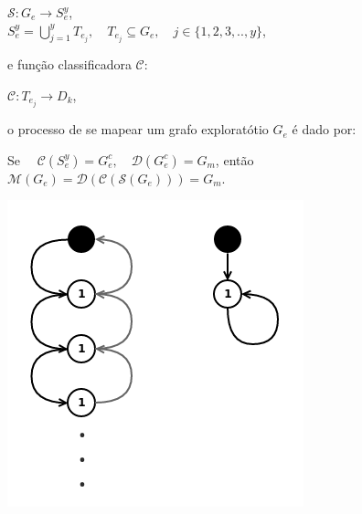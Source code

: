 \begin{center}
  $\mathcal{S}:G_e \rightarrow S_e^y$,
   \\
   \hfill \break
  $S_e^y = \bigcup\limits_{j=1}^y T_{e_j},
   \quad T_{e_j} \subseteq G_e,
   \quad j \in \{ 1, 2, 3, .., y \}$,
\end{center}

e função classificadora $\mathcal{C}$:

\begin{center}
  $\mathcal{C}:T_{e_j} \rightarrow D_k$,
\end{center}

o processo de se mapear um grafo exploratótio $G_e$ é dado por:

\begin{center}
  Se $\quad \mathcal{C}({S_e^y}) = {G_e^c},
      \quad \mathcal{D}({G_e^c}) = {G_m}$, então
      \\
      \hfill \break
     $\mathcal{M}({G_e}) = \mathcal{D}(\mathcal{C}(\mathcal{S}({G_e}))) = {G_m}$.
\end{center}

{
  \centering
  \captionsetup{type=figure}
	\includegraphics[scale=0.5]{./figures/Figure021-Recursion.png}
	\label{Figure021-Recursion}
}

